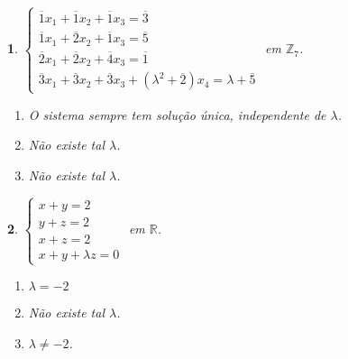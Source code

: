 \documentclass[12pt]{exam}
\newtheorem{exercicio}{}
\newcommand{\integer}{\mathbb{Z}}
\newcommand{\real}{\mathbb{R}}
\begin{document}
\begin{exercicio}
$\begin{cases}
  \overline{1}x_1 + \overline{1}x_2 + \overline{1}x_3 = \overline{3}\\
  \overline{1}x_1 + \overline{2}x_2 + \overline{1}x_3 = \overline{5}\\
  \overline{2}x_1 + \overline{2}x_2 + \overline{4}x_3 = \overline{1}\\
  \overline{3}x_1 + \overline{3}x_2 + \overline{3}x_3 + (\lambda^2 + \overline{2})x_4 = \lambda + \overline{5}
\end{cases}$ em $\integer_7$.
\begin{solucao}
  \begin{enumerate}[label={\alph*})]
    \item O sistema sempre tem solu\c{c}\~ao \'unica, independente de $\lambda$.
    \item N\~ao existe tal $\lambda$.
    \item N\~ao existe tal $\lambda$.
  \end{enumerate}
\end{solucao}
\end{exercicio}

\begin{exercicio}\label{sistemasfim}
$\begin{cases}
  x + y = 2\\
  y + z = 2\\
  x + z = 2\\
  x + y + \lambda z = 0
\end{cases}$ em $\real$.
\begin{solucao}
  \begin{enumerate}[label={\alph*})]
    \item $\lambda = -2$
    \item N\~ao existe tal $\lambda$.
    \item $\lambda \ne -2$.
  \end{enumerate}
\end{solucao}
\end{exercicio}
\end{document}
